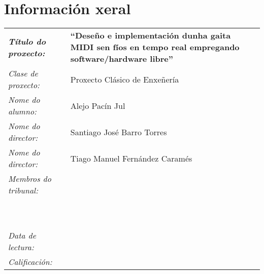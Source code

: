 \thispagestyle{empty}
\section*{Información xeral}
\vfill
\begin{center}
\begin{tabular}{p{4.5cm}p{9cm}}
\textbf{\emph{Título do proxecto:}} & \textbf{``Deseño e implementación dunha gaita MIDI sen fíos en tempo real empregando software/hardware libre''} \\[0.5cm]
\emph{Clase de proxecto:} & Proxecto Clásico de Enxeñería \\[0.5cm]
\emph{Nome do alumno:} & Alejo Pacín Jul \\[0.5cm]
\emph{Nome do director:} & Santiago José Barro Torres \\[0.5cm]
\emph{Nome do director:} & Tiago Manuel Fernández Caramés \\[0.5cm]
\emph{Membros do tribunal:} & \\[0.5cm]
& \\
& \\
& \\
& \\
& \\
& \\
& \\
& \\
& \\
& \\
\emph{Data de lectura:} & \\[0.5cm]
\emph{Calificación:} & \\
\end{tabular}
\end{center}
\vfill
